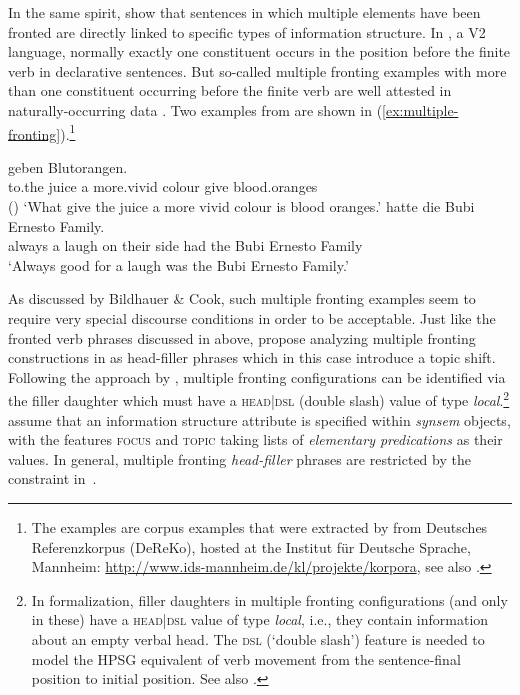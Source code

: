 \documentclass[output=paper,biblatex,babelshorthands,newtxmath,draftmode,colorlinks,citecolor=brown]{langscibook}
\begin{document}
\largerpage
{}
In the same spirit, \citet{BC2010a} show that sentences in which
multiple elements have been fronted are directly linked to specific
types of information structure. In , a V2 language, normally
exactly one constituent occurs in the position before the finite verb
in declarative sentences. But so-called multiple fronting examples
with more than one constituent occurring before the finite verb 
are well attested in naturally-occurring data \citep{Mueller2003b}. Two examples from
\citet[, 71]{BC2010a} are shown in (\ref{ex:multiple-fronting}).\footnote{The examples are corpus examples that were extracted by \citet{BC2010a} from Deutsches Referenzkorpus (DeReKo), hosted at the Institut für Deutsche Sprache, Mannheim: \url{http://www.ids-mannheim.de/kl/projekte/korpora}, see also .}
\begin{exe}
  \ex\label{ex:multiple-fronting}
  \begin{xlist}
    \ex{} geben Blutorangen.\\
            \spacebr{}to.the juice \spacebr{}a more.vivid colour give blood.oranges\\\hfill()
      \trans `What give the juice a more vivid colour is blood oranges.'
    \ex{} hatte die Bubi Ernesto Family.\\
            \spacebr{}always \spacebr{}a laugh on their side had the Bubi Ernesto Family\\
        \trans `Always good for a laugh was the Bubi Ernesto Family.'
  \end{xlist}

\end{exe}

As discussed by Bildhauer \& Cook, such multiple fronting
examples seem to require very special discourse conditions in order to
be acceptable. Just like the fronted verb phrases discussed in
 above, \citet{BC2010a} propose
analyzing multiple fronting constructions in  as head-filler
phrases which in this case introduce a topic shift. Following the
approach by \citet{Mueller2005d}, multiple fronting
configurations can be identified via the filler daughter which must
have a \textsc{head|dsl} (double slash) value of type
\textit{local}.\footnote{In  formalization, filler daughters in multiple fronting configurations (and only in these) have a  \textsc{head|dsl} value of type \textit{local}, i.e., they contain information about an empty verbal head. The \textsc{dsl} (‘double slash’) feature is needed to model the HPSG equivalent of verb movement from the sentence-final position to initial position. See also .} \citet{BC2010a} assume that an
information structure attribute is specified within \textit{synsem}
objects, with the features \textsc{focus} and \textsc{topic} taking
lists of \textit{elementary predications} as their values. In general,
multiple fronting \textit{head-filler} phrases are restricted by the
constraint in~.
\end{document}
